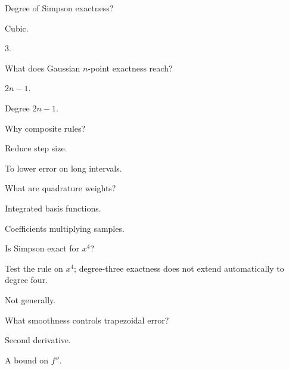 \begin{exercise}\label{exr:ii24-02}
Degree of Simpson exactness?
\end{exercise}
\begin{hint}
Cubic.
\end{hint}
\begin{solution}
$3$.
\end{solution}

\begin{exercise}\label{exr:ii24-03}
What does Gaussian $n$-point exactness reach?
\end{exercise}
\begin{hint}
$2n-1$.
\end{hint}
\begin{solution}
Degree $2n-1$.
\end{solution}

\begin{exercise}\label{exr:ii24-04}
Why composite rules?
\end{exercise}
\begin{hint}
Reduce step size.
\end{hint}
\begin{solution}
To lower error on long intervals.
\end{solution}

\begin{exercise}\label{exr:ii24-05}
What are quadrature weights?
\end{exercise}
\begin{hint}
Integrated basis functions.
\end{hint}
\begin{solution}
Coefficients multiplying samples.
\end{solution}

\begin{exercise}\label{exr:ii24-06}
Is Simpson exact for $x^4$?
\end{exercise}
\begin{hint}
Test the rule on \(x^4\); degree-three exactness does not extend automatically to degree four.
\end{hint}
\begin{solution}
Not generally.
\end{solution}

\begin{exercise}\label{exr:ii24-07}
What smoothness controls trapezoidal error?
\end{exercise}
\begin{hint}
Second derivative.
\end{hint}
\begin{solution}
A bound on $f''$.
\end{solution}

